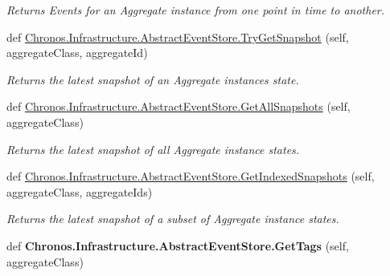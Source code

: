 \begin{DoxyCompactItemize}
\begin{DoxyCompactList}\small\item\em Returns Events for an Aggregate instance from one point in time to another. \end{DoxyCompactList}\item 
def \hyperlink{group__Chronos_ga8a92959c83ea59013f94648eac6ec94b}{Chronos.\+Infrastructure.\+Abstract\+Event\+Store.\+Try\+Get\+Snapshot} (self, aggregate\+Class, aggregate\+Id)
\begin{DoxyCompactList}\small\item\em Returns the latest snapshot of an Aggregate instance\textquotesingle{}s state. \end{DoxyCompactList}\item 
def \hyperlink{group__Chronos_ga8209810feeee912e6fe62f6244f38802}{Chronos.\+Infrastructure.\+Abstract\+Event\+Store.\+Get\+All\+Snapshots} (self, aggregate\+Class)
\begin{DoxyCompactList}\small\item\em Returns the latest snapshot of all Aggregate instance states. \end{DoxyCompactList}\item 
def \hyperlink{group__Chronos_gabd09dd35ed768b611c4135612a878285}{Chronos.\+Infrastructure.\+Abstract\+Event\+Store.\+Get\+Indexed\+Snapshots} (self, aggregate\+Class, aggregate\+Ids)
\begin{DoxyCompactList}\small\item\em Returns the latest snapshot of a subset of Aggregate instance states. \end{DoxyCompactList}\item 
def {\bfseries Chronos.\+Infrastructure.\+Abstract\+Event\+Store.\+Get\+Tags} (self, aggregate\+Class)\hypertarget{group__Chronos_gaed8bdb12e22ed9384f9f9cd9b724b390}{}\label{group__Chronos_gaed8bdb12e22ed9384f9f9cd9b724b390}


\end{DoxyCompactItemize}
